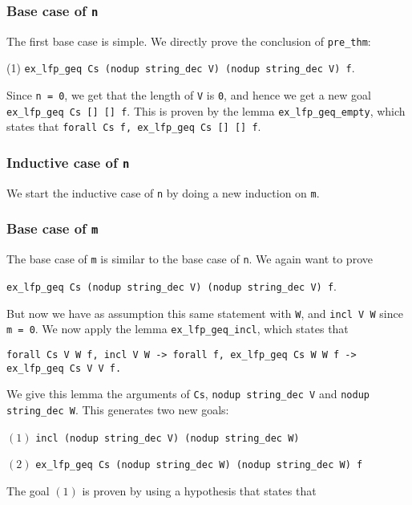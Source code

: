 \subsubsection{Base case of \lstinline{n}}

The first base case is simple. We directly prove the conclusion of \lstinline{pre_thm}:

(1) \tabto{2em}
\lstinline{ex_lfp_geq Cs (nodup string_dec V) (nodup string_dec V) f}.

Since \lstinline{n = 0}, we get that the length of \lstinline{V} is \lstinline{0},
and hence we get a new goal \lstinline{ex_lfp_geq Cs [] [] f}.
This is proven by the lemma \lstinline{ex_lfp_geq_empty},
which states that \lstinline{forall Cs f, ex_lfp_geq Cs [] [] f}.

\subsubsection{Inductive case of \lstinline{n}}

We start the inductive case of \lstinline{n} by doing a new induction on \lstinline{m}.

\subsubsection{Base case of \lstinline{m}}

The base case of \lstinline{m} is similar to the base case of \lstinline{n}.
We again want to prove

\tabto{2em}
\lstinline{ex_lfp_geq Cs (nodup string_dec V) (nodup string_dec V) f}.

But now we have as assumption this same statement with \lstinline{W},
and \lstinline{incl V W} since \lstinline{m = 0}.
We now apply the lemma \lstinline{ex_lfp_geq_incl}, which states that

\tabto{2em}
\lstinline{forall Cs V W f, incl V W -> forall f, ex_lfp_geq Cs W W f -> ex_lfp_geq Cs V V f.}

We give this lemma the arguments of \lstinline{Cs}, \lstinline{nodup string_dec V} and \lstinline{nodup string_dec W}.
This generates two new goals:

$(1)$
\tabto{2em}
\lstinline{incl (nodup string_dec V) (nodup string_dec W)}

$(2)$
\tabto{2em}
\lstinline{ex_lfp_geq Cs (nodup string_dec W) (nodup string_dec W) f}

The goal $(1)$ is proven by using a hypothesis that states that

